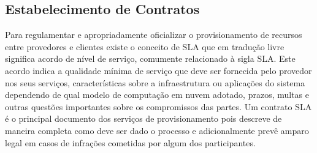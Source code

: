 \subsection{Estabelecimento de Contratos}
\label{subsec:nuvem_sla:estabelecimento_contratos}
%
Para regulamentar e apropriadamente oficializar o provisionamento de recursos entre provedores e clientes existe o conceito de \ac{SLA} que em tradução livre significa acordo de nível de serviço, comumente relacionado à sigla \ac{SLA}. 
%
Este acordo indica a qualidade mínima de serviço que deve ser fornecida pelo provedor nos seus serviços, características sobre a infraestrutura ou aplicações do sistema dependendo de qual modelo de computação em nuvem adotado, prazos, multas e outras questões importantes sobre os compromissos das partes. 
%
Um contrato \ac{SLA} é o principal documento dos serviços de provisionamento pois descreve de maneira completa como deve ser dado o processo e adicionalmente prevê amparo legal em casos de infrações cometidas por algum dos participantes.

